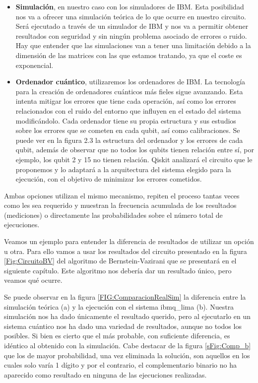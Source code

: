  \begin{itemize}
     \item \textbf{Simulación}, en nuestro caso con los simuladores de IBM. Esta posibilidad nos va a ofrecer una simulación teórica de lo que ocurre en nuestro circuito. Será ejecutado a través de un simulador de IBM y nos va a permitir obtener resultados con seguridad y sin ningún problema asociado de errores o ruido. Hay que entender que las simulaciones van a tener una limitación debido a la dimensión de las matrices con las que estamos tratando, ya que el coste es exponencial.
     
     \item \textbf{Ordenador cuántico}, utilizaremos los ordenadores de IBM. La tecnología para la creación de ordenadores cuánticos más fieles sigue avanzando. Esta intenta mitigar los errores que tiene cada operación, así como los errores relacionados con el ruido del entorno que influyen en el estado del sistema modificándolo. Cada ordenador tiene su propia estructura y sus estudios sobre los errores que se cometen en cada qubit, así como calibraciones. Se puede ver en la figura 2.3 la estructura del ordenador y los errores de cada qubit, además de observar que no todos los qubits tienen relación entre sí, por ejemplo, los qubit 2 y 15 no tienen relación. Qiskit analizará el circuito que le proponemos y lo adaptará a la arquitectura del sistema elegido para la ejecución, con el objetivo de minimizar los errores cometidos.
     
 \end{itemize}
 \newpage



 Ambas opciones utilizan el mismo mecanismo, repiten el proceso tantas veces como les sea requerido y muestran la frecuencia acumulada de los resultados (mediciones) o directamente las probabilidades sobre el número total de ejecuciones. \newline



 Veamos un ejemplo para entender la diferencia de resultados de utilizar un opción u otra. Para ello vamos a usar los resultados del circuito presentado en la figura \ref{Fig:CircuitoBV} del algoritmo de Bernstein-Vazirani que se presentará en el siguiente capítulo. Este algoritmo nos debería dar un resultado único, pero veamos qué ocurre. \newline


Se puede observar en la figura \ref{FIG:ComparacionRealSim} la diferencia entre la simulación teórica (a) y la ejecución con el sistema ibmq\_lima (b). Nuestra simulación nos ha dado únicamente el resultado querido, pero al ejecutarlo en un sistema cuántico nos ha dado una variedad de resultados, aunque no todos los posibles. Si bien es cierto que el más probable, con suficiente diferencia, es idéntico al obtenido con la simulación. Cabe destacar de la figura \ref{sFig:Comp_b} que los de mayor probabilidad, una vez eliminada la solución, son aquellos en los cuales solo varía 1 dígito y por el contrario, el complementario binario no ha aparecido como resultado en ninguna de las ejecuciones realizadas.

